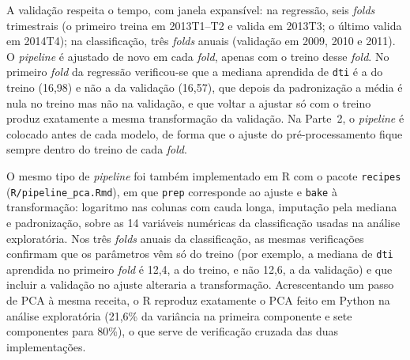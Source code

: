 A validação respeita o tempo, com janela expansível: na regressão, seis \textit{folds}
trimestrais (o primeiro treina em 2013T1--T2 e valida em 2013T3; o último valida em
2014T4); na classificação, três \textit{folds} anuais (validação em 2009, 2010 e 2011). O
\textit{pipeline} é ajustado de novo em cada \textit{fold}, apenas com o treino desse
\textit{fold}. No primeiro \textit{fold} da regressão verificou-se que a mediana aprendida
de \texttt{dti} é a do treino (16,98) e não a da validação (16,57), que depois da
padronização a média é nula no treino mas não na validação, e que voltar a ajustar só com
o treino produz exatamente a mesma transformação da validação. Na Parte~2, o
\textit{pipeline} é colocado antes de cada modelo, de forma que o ajuste do
pré-processamento fique sempre dentro do treino de cada \textit{fold}.

O mesmo tipo de \textit{pipeline} foi também implementado em R com o pacote \texttt{recipes}
(\texttt{R/pipeline\_pca.Rmd}), em que \texttt{prep} corresponde ao ajuste e \texttt{bake} à
transformação: logaritmo nas colunas com cauda longa, imputação pela mediana e padronização,
sobre as 14 variáveis numéricas da classificação usadas na análise exploratória. Nos três
\textit{folds} anuais da classificação, as mesmas verificações confirmam que os parâmetros vêm
só do treino (por exemplo, a mediana de \texttt{dti} aprendida no primeiro \textit{fold} é
12,4, a do treino, e não 12,6, a da validação) e que incluir a validação no ajuste alteraria a
transformação. Acrescentando um passo de PCA à mesma receita, o R reproduz exatamente o PCA
feito em Python na análise exploratória (21,6\% da variância na primeira componente e sete
componentes para 80\%), o que serve de verificação cruzada das duas implementações.
